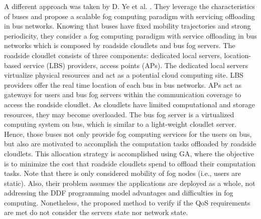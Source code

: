 %
\noindent\tab A different approach was taken by D. Ye et al. \cite{ye2016scalable}. They leverage the characteristics of buses and propose a scalable fog computing paradigm with servicing offloading in bus networks. Knowing that buses have fixed mobility trajectories and strong periodicity, they consider a fog computing paradigm with service offloading in bus networks which is composed by roadside cloudlets and bus fog servers. The roadside cloudlet consists of three components: dedicated local servers, location-based service (LBS) providers, access points (APs). The dedicated local servers virtualize physical resources and act as a potential cloud computing site. LBS providers offer the real time location of each bus in bus networks. APs act as gateways for users and bus fog servers within the communication coverage to access the roadside cloudlet. As cloudlets have limited computational and storage resources, they may become overloaded. The bus fog server is a virtualized computing system on bus, which is similar to a light-weight cloudlet server. Hence, those buses not only provide fog computing services for the users on bus, but also are motivated to accomplish the computation tasks offloaded by roadside cloudlets. This allocation strategy is accomplished using GA, where the objective is to minimize the cost that roadside cloudlets spend to offload their computation tasks. Note that there is only considered mobility of fog nodes (i.e., users are static). Also, their problem assumes the applications are deployed as a whole, not addressing the DDF programming model advantages and difficulties in fog computing. Nonetheless, the proposed method to verify if the QoS requirements are met do not consider the servers state nor network state. 

